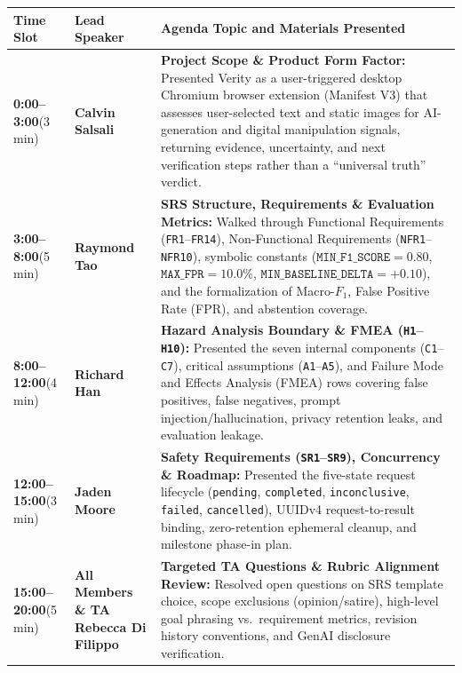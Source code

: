 \documentclass[11pt]{article}
\begin{document}
\begin{tabularx}{\textwidth}{P{2.2cm} P{3.4cm} Y}
\caption{October 7 TA Meeting Agenda and Member Speaking Roles} \label{TblOct7Agenda}\\
\toprule
\textbf{Time Slot} & \textbf{Lead Speaker} & \textbf{Agenda Topic and Materials Presented}\\
\midrule
\textbf{0:00--3:00}\newline (3 min) & \textbf{Calvin Salsali} & \textbf{Project Scope \& Product Form Factor:} Presented Verity as a user-triggered desktop Chromium browser extension (Manifest V3) that assesses user-selected text and static images for AI-generation and digital manipulation signals, returning evidence, uncertainty, and next verification steps rather than a ``universal truth'' verdict.\\
\addlinespace
\textbf{3:00--8:00}\newline (5 min) & \textbf{Raymond Tao} & \textbf{SRS Structure, Requirements \& Evaluation Metrics:} Walked through Functional Requirements (\texttt{FR1}--\texttt{FR14}), Non-Functional Requirements (\texttt{NFR1}--\texttt{NFR10}), symbolic constants ($\texttt{MIN\_F1\_SCORE} = 0.80$, $\texttt{MAX\_FPR} = 10.0\%$, $\texttt{MIN\_BASELINE\_DELTA} = +0.10$), and the formalization of Macro-$F_1$, False Positive Rate (FPR), and abstention coverage.\\
\addlinespace
\textbf{8:00--12:00}\newline (4 min) & \textbf{Richard Han} & \textbf{Hazard Analysis Boundary \& FMEA (\texttt{H1}--\texttt{H10}):} Presented the seven internal components (\texttt{C1}--\texttt{C7}), critical assumptions (\texttt{A1}--\texttt{A5}), and Failure Mode and Effects Analysis (FMEA) rows covering false positives, false negatives, prompt injection/hallucination, privacy retention leaks, and evaluation leakage.\\
\addlinespace
\textbf{12:00--15:00}\newline (3 min) & \textbf{Jaden Moore} & \textbf{Safety Requirements (\texttt{SR1}--\texttt{SR9}), Concurrency \& Roadmap:} Presented the five-state request lifecycle (\texttt{pending}, \texttt{completed}, \texttt{inconclusive}, \texttt{failed}, \texttt{cancelled}), UUIDv4 request-to-result binding, zero-retention ephemeral cleanup, and milestone phase-in plan.\\
\addlinespace
\textbf{15:00--20:00}\newline (5 min) & \textbf{All Members \& TA Rebecca Di Filippo} & \textbf{Targeted TA Questions \& Rubric Alignment Review:} Resolved open questions on SRS template choice, scope exclusions (opinion/satire), high-level goal phrasing vs.\ requirement metrics, revision history conventions, and GenAI disclosure verification.\\
\bottomrule
\end{tabularx}
\end{document}
